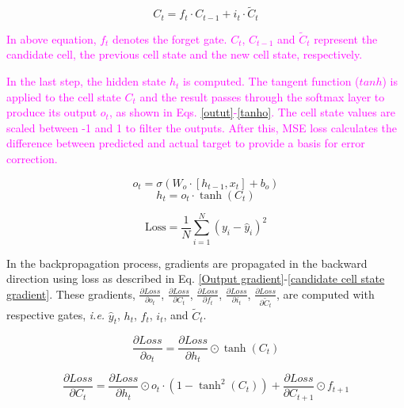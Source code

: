 \documentclass[journal]{IEEEtran}
\begin{document}
\begin{equation}\label{cell state}
C_t = f_t \cdot C_{t-1} + i_t \cdot \tilde{C}_t
\end{equation}

\textcolor{magenta}{In above equation, $f_t$ denotes the forget gate. ${C}_t$, $C_{t-1}$ and $\tilde{C}_t$ represent the candidate cell, the previous cell state and the new cell
state, respectively.}



\textcolor{magenta}{In the last step, the hidden state ${h}_t$  is computed. The tangent function ($tanh$) is applied to the
cell state ${C}_t$ and the result passes through the softmax layer to produce its output ${o}_t$, as shown in Eqs. \eqref{outut}-\eqref{tanho}. The cell
state values are scaled between -1 and 1 to filter the outputs. After this, MSE loss calculates the difference between predicted and actual target to provide a basis for
error correction.}



\begin{equation}\label{outut}
o_t = \sigma(W_o \cdot [h_{t-1}, x_t] + b_o)
\end{equation}
\begin{equation}\label{tanho}
h_t = o_t \cdot \tanh(C_t)
\end{equation}

 

\begin{equation} \label{Loss}
\text{Loss} = \frac{1}{N} \sum_{i=1}^{N} \left( y_i - \hat{y}_i \right)^2
\end{equation}

In the backpropagation process, gradients are propagated in the backward direction using loss as described in Eq. \eqref{Output gradient}-\eqref{candidate cell state gradient}. These gradients, $\frac{\partial Loss}{\partial o_t}$, $\frac{\partial Loss}{\partial C_t}$, $\frac{\partial Loss}{\partial f_t}$, $\frac{\partial Loss}{\partial i_t}$, $\frac{\partial Loss}{\partial \tilde{C}_t}$, are computed with respective gates, \textit{i.e.} $\hat{y}_t$, $h_t$, $f_t$, $i_t$, and $\tilde{C}_t$.


\begin{equation}\label{Output gradient}
    \frac{\partial Loss}{\partial o_t} = \frac{\partial Loss}{\partial h_t} \odot \tanh(C_t)
\end{equation}



\begin{equation}\label{cell state gradient}
    \frac{\partial Loss}{\partial C_t} = \frac{\partial Loss}{\partial h_t} \odot o_t \cdot (1 - \tanh^2(C_t)) + \frac{\partial Loss}{\partial C_{t+1}} \odot f_{t+1}
\end{equation}
\end{document}
